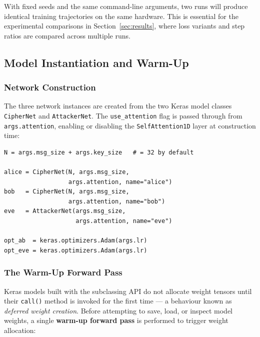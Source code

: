 \documentclass[12pt, a4paper]{article}
\newcommand{\code}[1]{\texttt{\color{CodeRed}#1}}
\begin{document}
With fixed seeds and the same command-line arguments, two runs will
produce identical training trajectories on the same hardware.
This is essential for the experimental comparisons in Section~\ref{sec:results},
where loss variants and step ratios are compared across multiple runs.

\subsection{Model Instantiation and Warm-Up}
\label{subsec:model_init}

\subsubsection*{Network Construction}

The three network instances are created from the two Keras model classes
\code{CipherNet} and \code{AttackerNet}. The \code{use\_attention} flag
is passed through from \code{args.attention}, enabling or disabling the
\code{SelfAttention1D} layer at construction time:

\begin{lstlisting}[caption={Network instantiation at the start of \code{main()}}]
N = args.msg_size + args.key_size   # = 32 by default

alice = CipherNet(N, args.msg_size,
                  args.attention, name="alice")
bob   = CipherNet(N, args.msg_size,
                  args.attention, name="bob")
eve   = AttackerNet(args.msg_size,
                    args.attention, name="eve")

opt_ab  = keras.optimizers.Adam(args.lr)
opt_eve = keras.optimizers.Adam(args.lr)
\end{lstlisting}

\subsubsection*{The Warm-Up Forward Pass}

Keras models built with the subclassing API do not allocate weight
tensors until their \code{call()} method is invoked for the first time
--- a behaviour known as \emph{deferred weight creation}. Before
attempting to save, load, or inspect model weights, a single
\textbf{warm-up forward pass} is performed to trigger weight
allocation:
\end{document}

